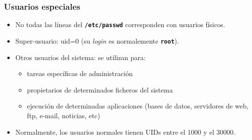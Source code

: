 \documentclass[ucs]{beamer}
\begin{document}
\begin{frame}[fragile]
  \frametitle{Usuarios especiales}
  \begin{itemize}
    \item No todas las líneas del \texttt{\textbf{/etc/passwd}} corresponden con usuarios físicos.
    \item Super-usuario: uid=0 (su \emph{login} es normalemente \texttt{\textbf{root}}).
    \item Otros usuarios del sistema: se utilizan para:
      \begin{itemize}
        \item tareas específicas de administración
        \item propietarios de determinados ficheros del sistema
        \item ejecución de determinadas aplicaciones (bases de datos, servidores de web, ftp, e-mail, noticias, etc)
      \end{itemize}
    \item Normalmente, los usuarios normales tienen UIDs entre el 1000 y el 30000.
  \end{itemize}
\end{frame}

\end{document}
